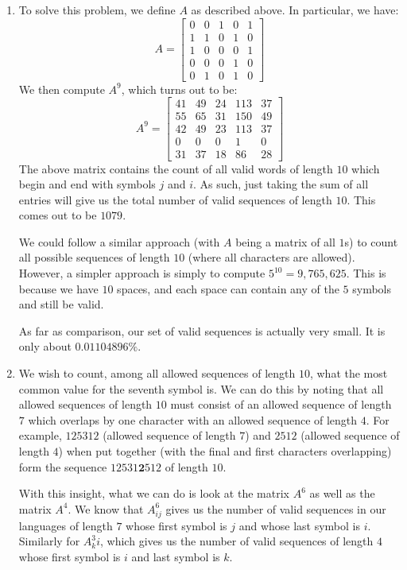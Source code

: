 \documentclass[12pt]{exam}
\begin{document}
\begin{questions}
\begin{solution}
\begin{enumerate}[label=(\alph*)]
    \item 
      To solve this problem, we define $A$ as described above. In particular, we have:
      $$
      A = \begin{bmatrix}
        0 & 0 & 1 & 0 & 1 \\
        1 & 1 & 0 & 1 & 0 \\
        1 & 0 & 0 & 0 & 1 \\
        0 & 0 & 0 & 1 & 0 \\
        0 & 1 & 0 & 1 & 0
      \end{bmatrix}
      $$
      We then compute $A^9$, which turns out to be:
      $$
      A^9 = \begin{bmatrix}
        41 & 49 & 24 & 113 & 37 \\
        55 & 65 & 31 & 150 & 49 \\
        42 & 49 & 23 & 113 & 37 \\
        0 & 0 & 0 & 1 & 0 \\
        31 & 37 & 18 & 86 & 28
      \end{bmatrix}
      $$
      The above matrix contains the count of all valid words of length $10$ which begin and end with symbols $j$ and $i$. As such, just taking the sum of all entries will give us the total number of valid sequences of length $10$. This comes out to be $1079$.

      We could follow a similar approach (with $A$ being a matrix of all $1$s) to count all possible sequences of length $10$ (where all characters are allowed). However, a simpler approach is simply to compute $5^{10} = 9,765,625$. This is because we have $10$ spaces, and each space can contain any of the $5$ symbols and still be valid.

      As far as comparison, our set of valid sequences is actually very small. It is only about $0.01104896\%$.

    \item
      We wish to count, among all allowed sequences of length $10$, what the most common value for the seventh symbol is. We can do this by noting that all allowed sequences of length $10$ must consist of an allowed sequence of length $7$ which overlaps by one character with an allowed sequence of length $4$. For example, $125312$ (allowed sequence of length $7$) and $2512$ (allowed sequence of length $4$) when put together (with the final and first characters overlapping) form the sequence $12531\textbf{2}512$ of length $10$.

      With this insight, what we can do is look at the matrix $A^6$ as well as the matrix $A^4$. We know that $A^6_{ij}$ gives us the number of valid sequences in our languages of length $7$ whose first symbol is $j$ and whose last symbol is $i$. Similarly for $A^3_ki$, which gives us the number of valid sequences of length $4$ whose first symbol is $i$ and last symbol is $k$.


\end{enumerate}
\end{solution}
\end{questions}
\end{document}

